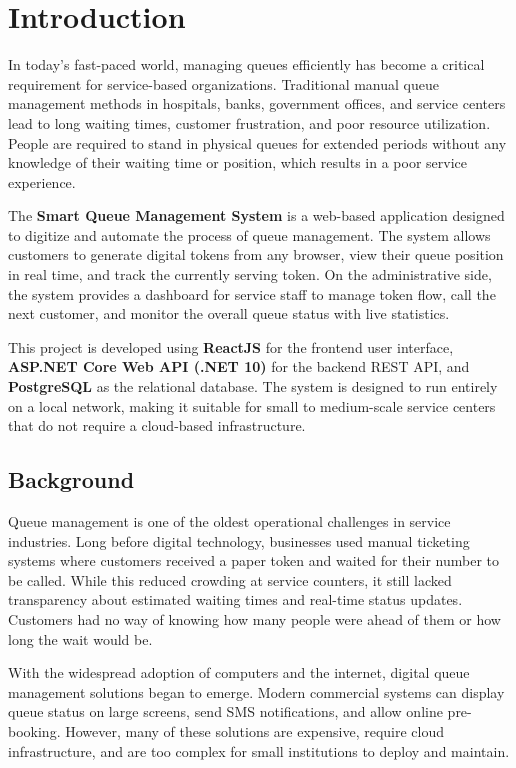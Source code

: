 
\chapter{Introduction}

In today's fast-paced world, managing queues efficiently has become a critical requirement for service-based organizations. Traditional manual queue management methods in hospitals, banks, government offices, and service centers lead to long waiting times, customer frustration, and poor resource utilization. People are required to stand in physical queues for extended periods without any knowledge of their waiting time or position, which results in a poor service experience.

The \textbf{Smart Queue Management System} is a web-based application designed to digitize and automate the process of queue management. The system allows customers to generate digital tokens from any browser, view their queue position in real time, and track the currently serving token. On the administrative side, the system provides a dashboard for service staff to manage token flow, call the next customer, and monitor the overall queue status with live statistics.

This project is developed using \textbf{ReactJS} for the frontend user interface, \textbf{ASP.NET Core Web API (.NET 10)} for the backend REST API, and \textbf{PostgreSQL} as the relational database. The system is designed to run entirely on a local network, making it suitable for small to medium-scale service centers that do not require a cloud-based infrastructure.

\section{Background}

Queue management is one of the oldest operational challenges in service industries. Long before digital technology, businesses used manual ticketing systems where customers received a paper token and waited for their number to be called. While this reduced crowding at service counters, it still lacked transparency about estimated waiting times and real-time status updates. Customers had no way of knowing how many people were ahead of them or how long the wait would be.

With the widespread adoption of computers and the internet, digital queue management solutions began to emerge. Modern commercial systems can display queue status on large screens, send SMS notifications, and allow online pre-booking. However, many of these solutions are expensive, require cloud infrastructure, and are too complex for small institutions to deploy and maintain.

